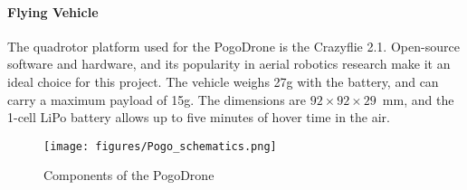 \documentclass[letterpaper,10pt,conference]{ieeeconf}
\newcommand{\david}[1]{{\color{blue}#1}}
\newcommand{\brian}[1]{{\color{brown}#1}}
\begin{document}
\paragraph{Flying Vehicle} 
The quadrotor platform used for the PogoDrone is the Crazyflie 2.1. Open-source software and hardware, and its popularity in aerial robotics research make it an ideal choice for this project. The vehicle weighs 27g with the battery, and can carry a maximum payload of 15g. The dimensions are $92\times92\times29$~mm, and the 1-cell LiPo battery allows up to five minutes of hover time in the air. 



\begin{figure}[t]
\centering
    \texttt{[image: figures/Pogo\_schematics.png]}
    \caption{Components of the PogoDrone}
    \vspace{-1em}
    \label{fig:pogodroneCAD}
\end{figure}
%
\end{document}
